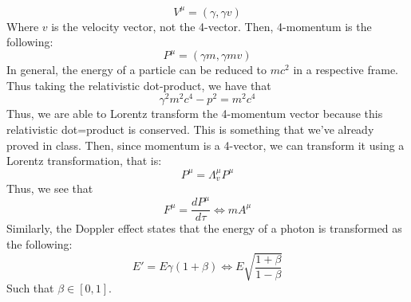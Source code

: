 \documentclass{article}
\newtheorem{one minute paper}[theorem]{One Minute Paper}
\begin{document}
\begin{equation}
    V^\mu = (\gamma, \gamma v)
\end{equation}
Where $v$ is the velocity vector, not the 4-vector. Then, 4-momentum is the following:
\begin{equation}
    P^\mu = (\gamma m, \gamma m v)
\end{equation}
In general, the energy of a particle can be reduced to $mc^2$ in a respective frame. Thus taking the relativistic dot-product, we have that 
\begin{equation}
    \gamma^2m^2c^4 - p^2 = m^2c^4  
\end{equation}
Thus, we are able to Lorentz transform the 4-momentum vector because this relativistic dot=product is conserved. This is something that we've already proved in class. Then, since momentum is a 4-vector, we can transform it using a Lorentz transformation, that is:
\begin{equation}
    P^\mu = \Lambda^\mu_v P^\mu
\end{equation}
Thus, we see that 
\begin{equation}
    F^\mu = \frac{dP^\mu}{d\tau} \iff mA^\mu
\end{equation}
Similarly, the Doppler effect states that the energy of a photon is transformed as the following:
\begin{equation}
    E' = E\gamma(1 + \beta) \iff E\sqrt{\frac{1 + \beta}{1 - \beta}}
\end{equation}
Such that $\beta \in [0,1]$.
\end{document}
